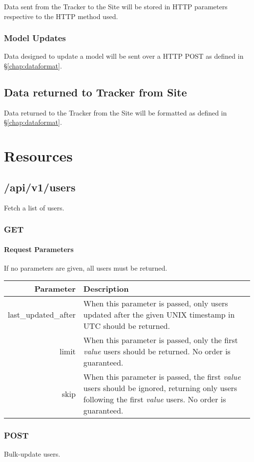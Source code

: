\documentclass[10pt,letterpaper,titlepage]{report}
\begin{document}
Data sent from the Tracker to the Site will be stored in HTTP parameters respective to the HTTP method used.

\subsubsection{Model Updates}

Data designed to update a model will be sent over a HTTP POST as defined in \S\ref{chap:dataformat}.

\subsection{Data returned to Tracker from Site}

Data returned to the Tracker from the Site will be formatted as defined in \S\ref{chap:dataformat}.

\section{Resources}

\subsection{/api/v1/users}

Fetch a list of users.

\subsubsection{GET}

\paragraph{Request Parameters}

If no parameters are given, all users must be returned. \\

\begin{tabular}{| r | p{5cm} |}
	\hline
	
	\textbf{Parameter} & \textbf{Description} \\ \hline
	
	last\_updated\_after & When this parameter is passed, only users updated after the given UNIX timestamp in UTC should be returned. \\ \hline
	
	limit & When this parameter is passed, only the first \textit{value} users should be returned. No order is guaranteed.  \\ \hline
	
	skip & When this parameter is passed, the first \textit{value} users should be ignored, returning only users following the first \textit{value} users. No order is guaranteed. \\ \hline
\end{tabular}

\subsubsection{POST}

Bulk-update users.
\end{document}
